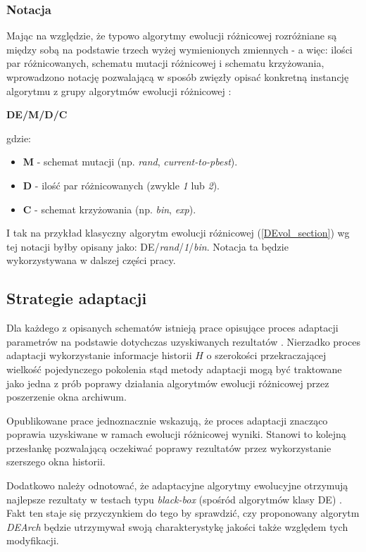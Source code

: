 \documentclass[12pt,a4paper]{report}
\begin{document}
{{{\subsubsection{Notacja}
\par{
Mając na względzie, że typowo algorytmy ewolucji różnicowej rozróżniane są między sobą na podstawie trzech wyżej wymienionych zmiennych - a więc: ilości par różnicowanych, schematu mutacji różnicowej i schematu krzyżowania, wprowadzono notację pozwalającą w sposób zwięzły opisać konkretną instancję algorytmu z grupy algorytmów ewolucji różnicowej \cite{PracticalInsights}:
\begin{center}
\textbf{DE/M/D/C}
\end{center}
gdzie:
\begin{itemize}
\item \textbf{M} - schemat mutacji (np. \emph{rand}, \emph{current-to-pbest}).
\item \textbf{D} - ilość par różnicowanych (zwykle \emph{1} lub \emph{2}).
\item \textbf{C} - schemat krzyżowania (np. \emph{bin}, \emph{exp}).
\end{itemize}
I tak na przykład klasyczny algorytm ewolucji różnicowej (\ref{DEvol_section}) wg tej notacji byłby opisany jako: DE/\emph{rand}/\emph{1}/\emph{bin}. Notacja ta będzie wykorzystywana w dalszej części pracy.
}


\subsection{Strategie adaptacji}
\label{Adaptation}
\par{
Dla każdego z opisanych schematów istnieją prace opisujące proces adaptacji parametrów na podstawie dotychczas uzyskiwanych rezultatów \cite{zhang2009adaptive,JADE,SHADE}. Nierzadko proces adaptacji wykorzystanie informacje historii $H$ o szerokości przekraczającej wielkość pojedynczego pokolenia stąd metody adaptacji mogą być traktowane jako jedna z prób poprawy działania algorytmów ewolucji różnicowej przez poszerzenie okna archiwum.
}
\par{
Opublikowane prace jednoznacznie wskazują, że proces adaptacji znacząco poprawia uzyskiwane w ramach ewolucji różnicowej wyniki. Stanowi to kolejną przesłankę pozwalającą oczekiwać poprawy rezultatów przez wykorzystanie szerszego okna historii.
}
\par{
Dodatkowo należy odnotować, że adaptacyjne algorytmy ewolucyjne otrzymują najlepsze rezultaty w testach typu \emph{black-box} (spośród algorytmów klasy DE) \cite{CEC2013Comp}. Fakt ten staje się przyczynkiem do tego by sprawdzić, czy proponowany algorytm \emph{DEArch} będzie utrzymywał swoją charakterystykę jakości także względem tych modyfikacji.
}

}}}
\end{document}

